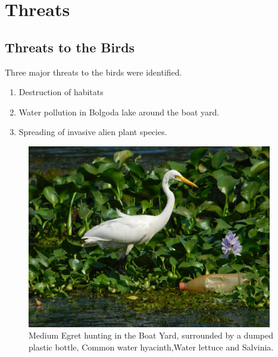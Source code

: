 \chapter{Threats}
\section{Threats to the Birds}
 Three major threats  to the birds were identified.
\begin{enumerate}
    \item Destruction of habitats
    \item Water pollution in Bolgoda lake around the boat yard.
    \item Spreading of invasive alien plant species.
\end{enumerate}
\begin{figure}[!htpb]
    \centering
    \includegraphics[width=0.955\textwidth]{Figures/threats.jpg}
    \caption[]{Medium Egret hunting in the Boat Yard, surrounded by a dumped plastic bottle, Common water hyacinth,Water lettuce and Salvinia.}
    \label{fig:figure-01}
\end{figure}
